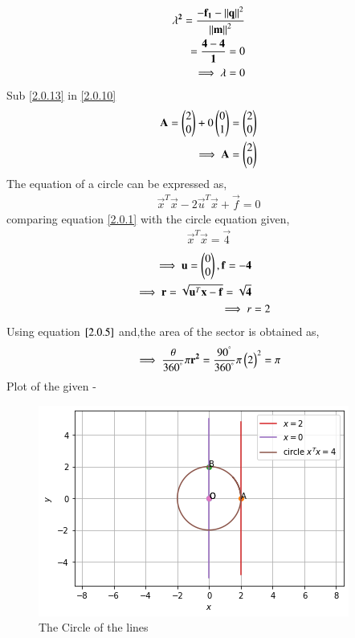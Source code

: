 \documentclass[journal,12pt,twocolumn]{IEEEtran}
\begin{document}
\begin{align}
 \mathbf{\lambda^2}=\frac{{\mathbf{-f_1}-\left\lVert\mathbf{q}\right\rVert^2}}{{\left\lVert\mathbf{m}\right\rVert^2}}\\=\frac{{\mathbf{4}-\mathbf{4}}}{{\mathbf{1}}}=0
 \\
\implies \lambda=0 \label{2.0.13}
\end{align}
Sub \eqref{2.0.13} in \eqref{2.0.10}
\begin{align}
 \mathbf{A}=\begin{pmatrix}2 \\0\end{pmatrix}+0\begin{pmatrix}0\\1\end{pmatrix}=\begin{pmatrix}2\\0\end{pmatrix}
 \\
 \implies \mathbf{A}=\begin{pmatrix}2 \\ 0\end{pmatrix}
\end{align}
The equation of a circle can be expressed as,
\begin{align}
\vec{x}^T\vec{x} - 2\vec{u}^T\vec{x} + \vec{f}= 0
\label{2.0.1}
\end{align}
comparing equation \eqref{2.0.1} with the circle equation given,
\begin{align}
\vec{x}^T\vec{x} = \vec{4}
\end{align}
\begin{align}
\implies \mathbf{u}=\begin{pmatrix}0\\0\end{pmatrix},\mathbf{f}=\mathbf{-4}
\\
\implies \mathbf{r}=\sqrt{\mathbf{u}^T\mathbf{x}-\mathbf{f}}=\sqrt{\mathbf{4}}
\\
\implies r &=2 \label{2.0.5}
\end{align}
Using equation $\eqref{2.0.5}$ and,the area of the sector is obtained as,
\begin{align}
 \implies  \frac{\theta}{360^{\degree}}\pi\mathbf{r^2}=\frac{90^{\degree}}{360^{\degree}}\pi\begin{pmatrix}2\end{pmatrix}^2=\pi
\end{align}
Plot of the given -
\begin{figure}[!ht]
\centering
\includegraphics[width=\columnwidth]{Figure 5.png}
\caption{The Circle of the lines }
\label{fig:The circle of the lines}	\end{figure}
\end{document}
